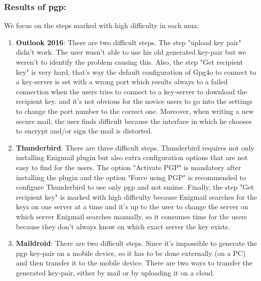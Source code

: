 \subsubsection{Results of \acrshort{pgp}:}
We focus on the steps marked with high difficulty in each \acrshort{mua}:
\begin{enumerate}
	\item \textbf{Outlook 2016}: There are two difficult steps. The step "upload key pair" didn't work. The user wasn't able to use his old generated key-pair but we weren't to identify the problem causing this. Also, the step "Get recipient key" is very hard, that's way the default configuration of Gpg4o to connect to a key-server is set with a wrong port which results always to a failed connection when the users tries to connect to a key-server to download the recipient key. and it's not obvious for the novice users to go into the settings to change the port number to the correct one. Moreover, when writing a new secure mail, the user finds difficult because the interface in which he chooses to encrypt and/or sign the mail is distorted.
	\item \textbf{Thunderbird}: There are three difficult steps. Thunderbird requires not only installing Enigmail plugin but also extra configuration options that are not easy to find for the users. The option "Activate PGP" is mandatory after installing the plugin and the option "Force using PGP" is recommended to configure Thunderbird to use only \acrshort{pgp} and not \acrshort{smime}. Finally, the step "Get recipient key" is marked with high difficulty because Enigmail searches for the keys on one server at a time and it's up to the user to change the server on which server Enigmail searches manually, so it consumes time for the users because they don't always know on which exact server the key exists.
	\item \textbf{Maildroid}: There are two difficult steps. Since it's impossible to generate the \acrshort{pgp} key-pair on a mobile device, so it has to be done externally (on a PC) and then transfer it to the mobile device. There are two ways to transfer the generated key-pair, either by mail or by uploading it on a cloud.
\end{enumerate}
